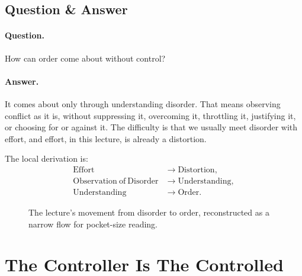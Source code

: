 \subsection{Question \& Answer}

\paragraph{Question.}
How can order come about without control?

\paragraph{Answer.}
It comes about only through understanding disorder. That means observing conflict as it is, without suppressing it, overcoming it, throttling it, justifying it, or choosing for or against it. The difficulty is that we usually meet disorder with effort, and effort, in this lecture, is already a distortion.

The local derivation is:
\begin{align}
\mathrm{Effort} &\longrightarrow \mathrm{Distortion},\\
\mathrm{Observation\ of\ Disorder} &\longrightarrow \mathrm{Understanding},\\
\mathrm{Understanding} &\longrightarrow \mathrm{Order}.
\end{align}

\begin{figure}
\centering
{}
\caption{The lecture's movement from disorder to order, reconstructed as a narrow flow for pocket-size reading.}
\end{figure}

\section{The Controller Is The Controlled}

